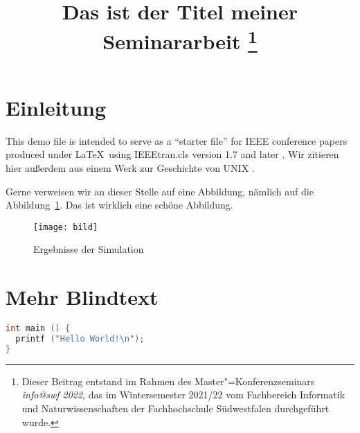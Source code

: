 \documentclass[twoside,a4paper]{IEEEtran}
\begin{document}
\title{Das ist der Titel meiner \\ Seminararbeit%
    \thanks{%
    Dieser Beitrag entstand im 
    Rahmen des Master"=Konferenzseminars \emph{info@swf 2022}, das im
    Wintersemester 2021/22 vom Fachbereich Informatik und
    Naturwissenschaften der Fachhochschule Südwestfalen
    durchgeführt wurde.}}
\author{
}

\maketitle


\begin{abstract}
\blindtext
\end{abstract}


\section{Einleitung}

This demo file is intended to serve as a ``starter file''
for IEEE conference papers produced under \LaTeX\ using
IEEEtran.cls version 1.7 and later \cite{tanenbaum2014modernos}.
Wir zitieren hier außerdem aus einem Werk zur Geschichte
von UNIX \cite{salus:0201547775:unix:history}.

\Blindtext[2]

Gerne verweisen wir an dieser Stelle auf eine Abbildung,
nämlich auf die Abbildung~\ref{bild1}. Das ist wirklich eine
schöne Abbildung.

\begin{figure}[b]
  \texttt{[image: bild]}
  \caption{Ergebnisse der Simulation}
  \label{bild1}
\end{figure}


\section{Mehr Blindtext}

\Blindtext[3]

\begin{lstlisting}[language=C,label=listing1,caption={Das ist das erste Listing (inline.c).}]
int main () {
  printf ("Hello World!\n");
}
\end{lstlisting}
\end{document}

